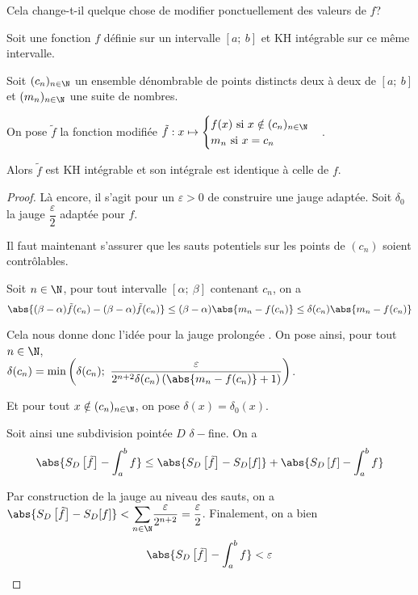 Cela change-t-il quelque chose de modifier ponctuellement des valeurs de $f$? 

\begin{lem}
Soit une fonction $f$ définie sur un intervalle $[a;~b]$ et KH intégrable sur ce même intervalle.

Soit $(c_n)_{n \in \N}$ un ensemble dénombrable de points distincts deux à deux de $[a;~b]$ et $(m_n)_{n \in \N}$ une suite de nombres.

On pose $\tilde{f}$ la fonction modifiée $\tilde{f}: x \mapsto \begin{cases}
f(x) \text{ si }x \notin (c_n)_{n \in \N} \\
m_n \text{ si }x=c_n
\end{cases}$.

Alors $\tilde{f}$ est KH intégrable et son intégrale est identique à celle de $f$.
\end{lem}


\begin{proof}
Là encore, il s'agit pour un $\varepsilon>0$ de construire une jauge adaptée.  Soit $\delta_0$ la jauge $\dfrac{\varepsilon}{2}$ adaptée pour $f$. 

Il faut maintenant s'assurer que les sauts potentiels sur les points de $(c_n)$ soient contrôlables.

Soit $n \in \N$, pour tout intervalle $[\alpha;~\beta]$ contenant $c_n$, on a
\[
\abs{(\beta-\alpha)\tilde{f}(c_n) - (\beta-\alpha)\tilde{f}(c_n)} \leq (\beta-\alpha) \abs{m_n-f(c_n)} \leq \delta(c_n) \abs{m_n-f(c_n)}
\]

Cela nous donne donc l'idée pour la jauge \og prolongée \fg{}. On pose ainsi, pour tout $n \in \N$,\\
$\delta(c_n) = \min \left (\delta(c_n);~\dfrac{\varepsilon}{2^{n+2} \delta(c_n) \left ( \abs{m_n-f(c_n)} + 1\right )} \right )$.

Et pour tout $x \notin (c_n)_{n \in \N}$, on pose $\delta(x) = \delta_0(x)$.

Soit ainsi une subdivision pointée $D$ $\delta-$fine. On a
\[
\abs{S_D\left [\tilde{f}\right ]-\int_a^b f} \leq \abs{S_D\left [\tilde{f}\right ] - S_D[f]}+\abs{S_D\left [f\right ]-\int_a^b f}
\]

Par construction de la jauge au niveau des sauts, on a $\abs{S_D\left [\tilde{f}\right ] - S_D[f]} < \displaystyle{\sum \limits_{n \in \N}} \dfrac{\varepsilon}{2^{n+2}} = \dfrac{\varepsilon}{2}$. Finalement, on a bien
\[
\abs{S_D\left [\tilde{f}\right ]-\int_a^b f} < \varepsilon
\]
\end{proof}

